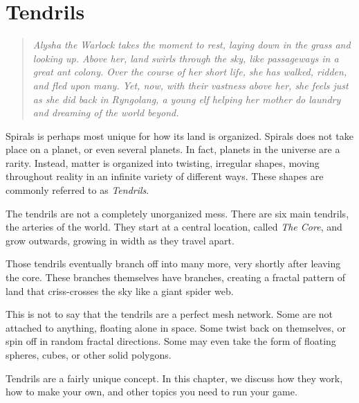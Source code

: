 \chapter{Tendrils}

\begin{quote}
\itshape
Alysha the Warlock takes the moment to rest, laying down in the grass and looking up.
Above her, land swirls through the sky, like passageways in a great ant colony.
Over the course of her short life, she has walked, ridden, and fled upon many.
Yet, now, with their vastness above her, she feels just as she did back in Ryngolang, a young elf helping her mother do laundry and dreaming of the world beyond.
\end{quote}

Spirals is perhaps most unique for how its land is organized.
Spirals does not take place on a planet, or even several planets.
In fact, planets in the universe are a rarity.
Instead, matter is organized into twisting, irregular shapes, moving throughout reality in an infinite variety of different ways.
These shapes are commonly referred to as \textit{Tendrils}.

The tendrils are not a completely unorganized mess.
There are six main tendrils, the arteries of the world. They start at a central location, called \textit{The Core}, and grow outwards, growing in width as they travel apart.

Those tendrils eventually branch off into many more, very shortly after leaving the core.
These branches themselves have branches, creating a fractal pattern of land that criss-crosses the sky like a giant spider web.

This is not to say that the tendrils are a perfect mesh network.
Some are not attached to anything, floating alone in space.
Some twist back on themselves, or spin off in random fractal directions.
Some may even take the form of floating spheres, cubes, or other solid polygons.


Tendrils are a fairly unique concept.
In this chapter, we discuss how they work, how to make your own, and other topics you need to run your game.

